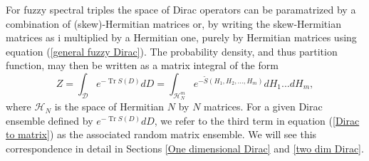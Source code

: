 \documentclass[10pt]{article}
\DeclareMathOperator{\tr}{Tr}
\newcommand{\ci}{\mathrm{i}}
\begin{document}

For fuzzy spectral triples the space of Dirac operators can be paramatrized by a combination of (skew)-Hermitian matrices or, by writing the skew-Hermitian matrices as $\ci$ multiplied by a Hermitian one, purely by Hermitian matrices using equation (\ref{general fuzzy Dirac}). 
The probability density, and thus partition function, may then be written as a matrix integral of the form  
\begin{equation} \label{Dirac to matrix}
  Z = \int_{\mathcal{D}} e^{-\tr S(D)}dD = \int_{\mathcal{H}_{N}^{m}} e^{-\tilde{S}( H_{1},  H_{2},..., H_{m})} dH_{1}... dH_{m}, 
\end{equation} 
where $\mathcal{H}_{N}$ is the space of Hermitian $N$ by $N$  matrices. For a given Dirac ensemble defined by $e^{-\tr S(D)}dD$, we refer to the third term in equation (\ref{Dirac to matrix}) as the associated random matrix ensemble.  We will see this correspondence in detail in Sections \ref{One dimensional Dirac} and \ref{two dim Dirac}.

\end{document}
